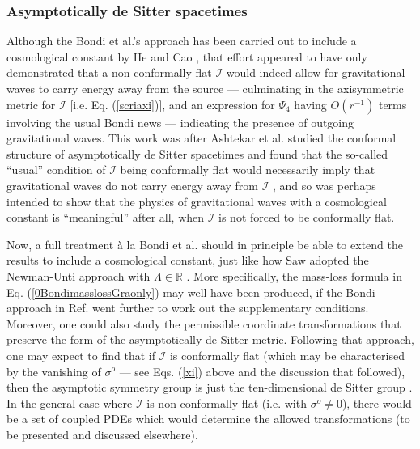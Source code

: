 \documentclass[aps,pre,preprint,superscriptaddress,showpacs,showkeys]{revtex4-1}
\newcommand{\R}{{\mathbb R}}
\begin{document}
\subsubsection{Asymptotically de Sitter spacetimes}\label{Section4B2}

Although the Bondi et al.'s approach has been carried out to include a cosmological constant by He and Cao \cite{chi1}, that effort appeared to have only demonstrated that a non-conformally flat $\mathcal{I}$ would indeed allow for gravitational waves to carry energy away from the source --- culminating in the axisymmetric metric for $\mathcal{I}$ [i.e. Eq. (\ref{scriaxi})], and an expression for $\Psi_4$ having $O(r^{-1})$ terms involving the usual Bondi news --- indicating the presence of outgoing gravitational waves. This work was after Ashtekar et al. studied the conformal structure of asymptotically de Sitter spacetimes and found that the so-called ``usual'' condition of $\mathcal{I}$ being conformally flat would necessarily imply that gravitational waves do not carry energy away from $\mathcal{I}$ \cite{ash1}, and so was perhaps intended to show that the physics of gravitational waves with a cosmological constant is ``meaningful'' after all, when $\mathcal{I}$ is not forced to be conformally flat.

Now, a full treatment \`{a} la Bondi et al. should in principle be able to extend the results to include a cosmological constant, just like how Saw adopted the Newman-Unti approach with $\Lambda\in\R$ \cite{Vee2016,Vee2017}. More specifically, the mass-loss formula in Eq. (\ref{0BondimasslossGraonly}) may well have been produced, if the Bondi approach in Ref. \cite{chi1} went further to work out the supplementary conditions. Moreover, one could also study the permissible coordinate transformations that preserve the form of the asymptotically de Sitter metric. Following that approach, one may expect to find that if $\mathcal{I}$ is conformally flat (which may be characterised by the vanishing of $\sigma^o$ --- see Eqs. (\ref{xi}) above and the discussion that followed), then the asymptotic symmetry group is just the ten-dimensional de Sitter group \cite{ash1}. In the general case where $\mathcal{I}$ is non-conformally flat (i.e. with $\sigma^o\neq0$), there would be a set of coupled PDEs which would determine the allowed transformations (to be presented and discussed elsewhere).

\end{document}
